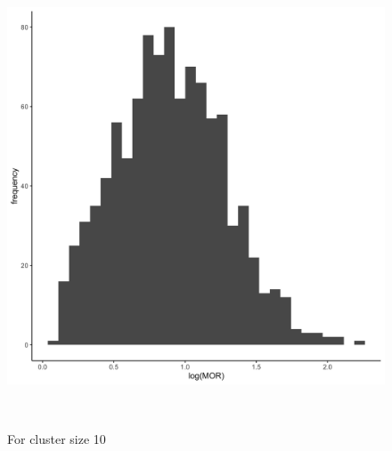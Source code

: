\documentclass[
  letterpaper,
  DIV=11,
  numbers=noendperiod,
  titlepage]{scrartcl}
\begin{document}
\begin{figure}
\begin{minipage}[t]{0.50\linewidth}
{{\includegraphics{../../plots/two-lvl-ran-slope/high-prev/hist_30_10_two_lvl_slp_high_prev.png}

}

\caption{For cluster size 10}

}

\end{minipage}%
\newline
\begin{minipage}[t]{\linewidth}

{\centering 

~

}

\end{minipage}%
\newline
\begin{minipage}[t]{0.50\linewidth}

{\centering 

\raisebox{-\height}{

}}
\end{minipage}
\end{figure}
\end{document}
